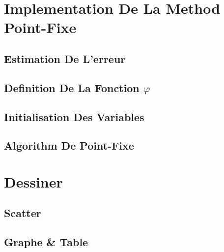 \newpage
\section{Implementation De La Method Point-Fixe}
\subsection{Estimation De L'erreur}


\vspace{0.5cm}
\subsection{Definition De La Fonction \(\varphi\)}


\vspace{0.5cm}
\subsection{Initialisation Des Variables}


\vspace{0.5cm}
\subsection{Algorithm De Point-Fixe}


\newpage
\section{Dessiner}
\subsection{Scatter}

\vspace{0.5cm}

\subsection{Graphe \& Table }


